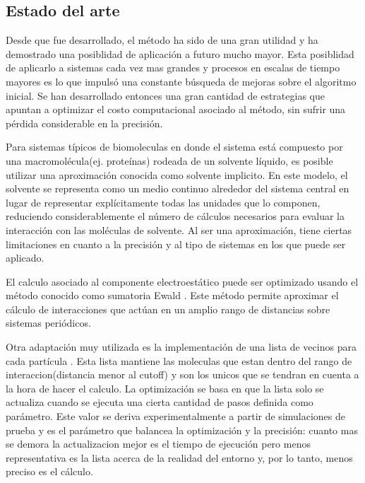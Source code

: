 \subsection{Estado del arte}



Desde que fue desarrollado, el método ha sido de una gran utilidad y ha demostrado una posiblidad de aplicación a futuro mucho mayor. 
Esta posiblidad de aplicarlo a sistemas cada vez mas grandes y procesos en escalas de tiempo mayores es lo que impulsó una constante búsqueda de mejoras sobre el algoritmo inicial.
Se han desarrollado entonces una gran cantidad de estrategias que apuntan a optimizar el costo computacional asociado al método, sin sufrir una pérdida considerable en la precisión.

Para sistemas típicos de biomoleculas en donde el sistema está compuesto por una macromolécula(ej. proteínas) rodeada de un solvente líquido, es posible utilizar una aproximación conocida como solvente implicito.
En este modelo, el solvente se representa como un medio continuo alrededor del sistema central en lugar de representar explícitamente todas las unidades que lo componen, reduciendo considerablemente el número de cálculos necesarios para evaluar la interacción con las moléculas de solvente. Al ser una aproximación, tiene ciertas limitaciones en cuanto a la precisión y al tipo de sistemas en los que puede ser aplicado.

El calculo asociado al componente electroestático puede ser optimizado usando el método conocido como sumatoria Ewald
. Este método permite aproximar el cálculo de interacciones que actúan en un amplio rango de distancias sobre sistemas periódicos. 

Otra adaptación muy utilizada es la implementación de una lista de vecinos para cada partícula %
. Esta lista mantiene las moleculas que estan dentro del rango de interaccion(distancia menor al cutoff) y son los unicos que se tendran en cuenta a la hora de hacer el calculo. La optimización se basa en que la lista solo se actualiza cuando se ejecuta una cierta cantidad de pasos definida como parámetro. 
Este valor se deriva experimentalmente a partir de simulaciones de prueba y es el parámetro que balancea la optimización y la precisión: cuanto mas se demora la actualizacion mejor es el tiempo de ejecución pero menos representativa es la lista acerca de la realidad del entorno y, por lo tanto, menos preciso es el cálculo.

